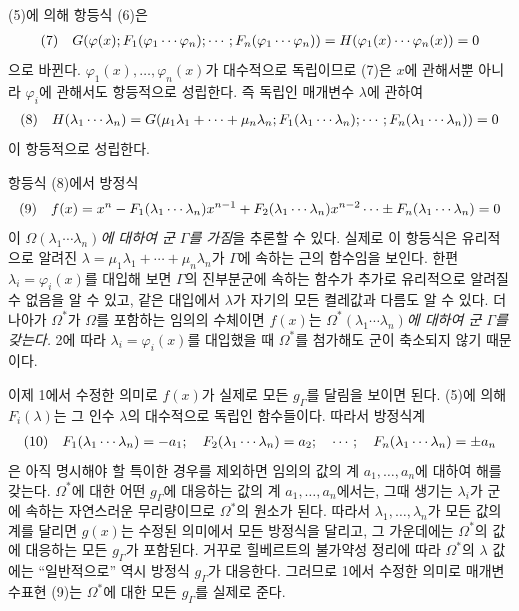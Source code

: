(5)에 의해 항등식 (6)은
\[
\begin{array}{@{}l@{\quad}l@{}}
(7)& \displaystyle G(\varphi(x);F_1(\varphi_1\cdots\varphi_n);\cdots;F_n(\varphi_1\cdots\varphi_n))=H(\varphi_1(x)\cdots\varphi_n(x))=0
\end{array}
\]
으로 바뀐다. \(\varphi_1(x),\ldots,\varphi_n(x)\)가 대수적으로 독립이므로 (7)은 \(x\)에 관해서뿐 아니라 \(\varphi_i\)에 관해서도 항등적으로 성립한다. 즉 독립인 매개변수 \(\lambda\)에 관하여
\[
\begin{array}{@{}l@{\quad}l@{}}
(8)& \displaystyle H(\lambda_1\cdots\lambda_n)=G(\mu_1\lambda_1+\cdots+\mu_n\lambda_n;F_1(\lambda_1\cdots\lambda_n);\cdots;F_n(\lambda_1\cdots\lambda_n))=0
\end{array}
\]
이 항등적으로 성립한다.

항등식 (8)에서 방정식
\[
\begin{array}{@{}l@{\quad}l@{}}
(9)& \displaystyle f(x)=x^n-F_1(\lambda_1\cdots\lambda_n)x^{n-1}+F_2(\lambda_1\cdots\lambda_n)x^{n-2}\cdots\pm F_n(\lambda_1\cdots\lambda_n)=0
\end{array}
\]
이 \emph{\(\Omega(\lambda_1\cdots\lambda_n)\)에 대하여 군 \(\Gamma\)를 가짐}을 추론할 수 있다. 실제로 이 항등식은 유리적으로 알려진 \(\lambda=\mu_1\lambda_1+\cdots+\mu_n\lambda_n\)가 \(\Gamma\)에 속하는 근의 함수임을 보인다. 한편 \(\lambda_i=\varphi_i(x)\)를 대입해 보면 \(\Gamma\)의 진부분군에 속하는 함수가 추가로 유리적으로 알려질 수 없음을 알 수 있고, 같은 대입에서 \(\lambda\)가 자기의 모든 켤레값과 다름도 알 수 있다. 더 나아가 \(\Omega^*\)가 \(\Omega\)를 포함하는 임의의 수체이면 \(f(x)\)는 \emph{\(\Omega^*(\lambda_1\cdots\lambda_n)\)에 대하여 군 \(\Gamma\)를 갖는다.} 2에 따라 \(\lambda_i=\varphi_i(x)\)를 대입했을 때 \(\Omega^*\)를 첨가해도 군이 축소되지 않기 때문이다.

이제 1에서 수정한 의미로 \(f(x)\)가 실제로 모든 \(g_\Gamma\)를 달림을 보이면 된다. (5)에 의해 \(F_i(\lambda)\)는 그 인수 \(\lambda\)의 대수적으로 독립인 함수들이다. 따라서 방정식계
\[
\begin{array}{@{}l@{\quad}l@{}}
(10)& \displaystyle F_1(\lambda_1\cdots\lambda_n)=-a_1;\quad F_2(\lambda_1\cdots\lambda_n)=a_2;\quad \cdots;\quad F_n(\lambda_1\cdots\lambda_n)=\pm a_n
\end{array}
\]
은 아직 명시해야 할 특이한 경우를 제외하면 임의의 값의 계 \(a_1,\ldots,a_n\)에 대하여 해를 갖는다. \(\Omega^*\)에 대한 어떤 \(g_\Gamma\)에 대응하는 값의 계 \(a_1,\ldots,a_n\)에서는, 그때 생기는 \(\lambda_i\)가 군에 속하는 자연스러운 무리량이므로 \(\Omega^*\)의 원소가 된다. 따라서 \(\lambda_1,\ldots,\lambda_n\)가 모든 값의 계를 달리면 \(g(x)\)는 수정된 의미에서 모든 방정식을 달리고, 그 가운데에는 \(\Omega^*\)의 값에 대응하는 모든 \(g_\Gamma\)가 포함된다. 거꾸로 힐베르트의 불가약성 정리에 따라 \(\Omega^*\)의 \(\lambda\) 값에는 ``일반적으로'' 역시 방정식 \(g_\Gamma\)가 대응한다. 그러므로 1에서 수정한 의미로 매개변수표현 (9)는 \(\Omega^*\)에 대한 모든 \(g_\Gamma\)를 실제로 준다.

